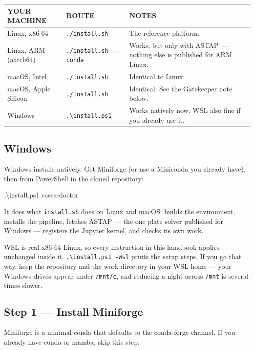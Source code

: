 \documentclass[11pt,a4paper]{article}
\newcommand{\cm}[1]{\texttt{\small #1}}
\newcommand{\thead}[1]{{\sffamily\bfseries\scriptsize\color{inkfaint}\MakeUppercase{#1}}}
\begin{document}
\begin{tabularx}{\textwidth}{@{}p{4.6cm}p{3.6cm}X@{}}
\toprule
\thead{Your machine} & \thead{Route} & \thead{Notes} \\
\midrule
Linux, x86-64            & \cm{./install.sh}        & The reference platform. \\
Linux, ARM (aarch64)     & \cm{./install.sh -{}-conda} & Works, but only with ASTAP --- nothing else is published for ARM Linux. \\
macOS, Intel             & \cm{./install.sh}        & Identical to Linux. \\
macOS, Apple Silicon     & \cm{./install.sh}        & Identical. See the Gatekeeper note below. \\
Windows                  & \cm{.\textbackslash install.ps1} & Works natively now. WSL also fine if you already use it. \\
\bottomrule
\end{tabularx}

\subsection{Windows}
Windows installs natively. Get Miniforge (or use a Miniconda you already have),
then from PowerShell in the cloned repository:

\begin{cmd}
\begin{cmdtext}
.\textbackslash{}install.ps1
cassa-doctor
\end{cmdtext}
\end{cmd}

It does what \cm{install.sh} does on Linux and macOS: builds the environment,
installs the pipeline, fetches ASTAP --- the one plate solver published for
Windows --- registers the Jupyter kernel, and checks its own work.

\begin{note}
WSL is real x86-64 Linux, so every instruction in this handbook applies
unchanged inside it. \cm{.\textbackslash install.ps1 -Wsl} prints the setup
steps. If you go that way, keep the repository and the work directory in your
WSL home --- your Windows drives appear under \cm{/mnt/c}, and reducing a night
across \cm{/mnt} is several times slower.
\end{note}

\subsection{Step 1 --- Install Miniforge}
Miniforge is a minimal conda that defaults to the conda-forge channel. If you
already have conda or mamba, skip this step.
\end{document}
